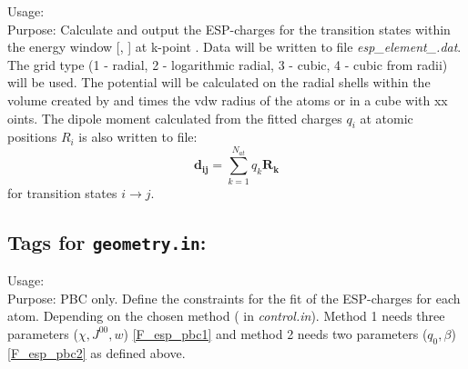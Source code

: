 {
  \noindent
  Usage:        \\[1.0ex]
  Purpose: Calculate and output the  ESP-charges for the transition states within the energy window [, ] at 
  k-point . Data will be written to file \textit{esp\_element\_}\textit{.dat}.
  The grid type  (1 - radial, 2 - logarithmic radial, 3 - cubic, 4 - cubic from radii) will be used. The potential 
  will be calculated on the  radial shells within the volume created by  and  
  times the vdw radius of the atoms or in a cube with xx oints. The dipole moment calculated from the fitted charges $q_i$ at atomic positions $R_i$ is 
  also written to file:
  \begin{equation}
   \mathbf{d_{ij}}=\sum_{k=1}^{N_{at}}q_k\mathbf{R_k}
  \end{equation}
  for transition states $ i \rightarrow j$.\\[1.0ex]
}
\subsection*{Tags for \texttt{geometry.in}:}
{
  \noindent
  Usage:    \\[1.0ex]
  Purpose: PBC only. Define the constraints for the fit of the ESP-charges for each atom. Depending on the chosen method 
  (  in \textit{control.in}). Method 1 needs three parameters ($\chi, J^{00}, w$) \ref{F_esp_pbc1}
  and method 2 needs two parameters ($q_0, \beta$) \ref{F_esp_pbc2} as defined above.\\[1.0ex]
}
